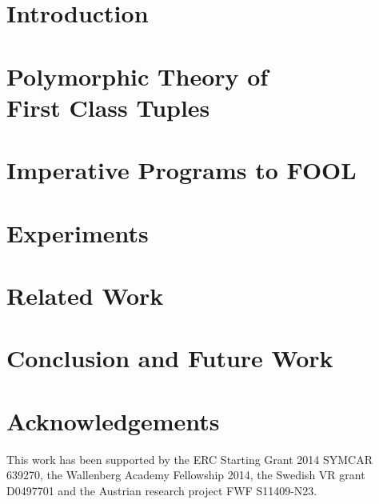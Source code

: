 



\section{Introduction}
\label{sec:boogie/introduction}


\section[Polymorphic Theory of First Class Tuples]{Polymorphic Theory of\\First Class Tuples}
\label{sec:boogie/tuples}


\section{Imperative Programs to FOOL}
\label{sec:boogie/technique}


\section{Experiments}
\label{sec:boogie/experiments}


\section{Related Work}
\label{sec:boogie/related}


\section{Conclusion and Future Work}
\label{sec:boogie/conclusions}


\section*{Acknowledgements}
This work has been supported by the ERC Starting Grant 2014 SYMCAR 639270, the Wallenberg Academy Fellowship 2014, the Swedish VR grant D0497701 and the Austrian research project FWF S11409-N23.